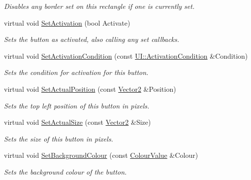 \begin{DoxyCompactItemize}
\begin{DoxyCompactList}\small\item\em Disables any border set on this rectangle if one is currently set. \item\end{DoxyCompactList}\item 
virtual void \hyperlink{classMezzanine_1_1UI_1_1Button_a89d0a1d2b0023be59e864b3c125f0dea}{SetActivation} (bool Activate)
\begin{DoxyCompactList}\small\item\em Sets the button as activated, also calling any set callbacks. \item\end{DoxyCompactList}\item 
virtual void \hyperlink{classMezzanine_1_1UI_1_1Button_a6c99108a01d71c521318640f52d2ee11}{SetActivationCondition} (const \hyperlink{namespaceMezzanine_1_1UI_aca58497951b1b9c7da10f214da3392f0}{UI::ActivationCondition} \&Condition)
\begin{DoxyCompactList}\small\item\em Sets the condition for activation for this button. \item\end{DoxyCompactList}\item 
virtual void \hyperlink{classMezzanine_1_1UI_1_1Button_ad7218bce5dda1c0e0bf91a83feaae47e}{SetActualPosition} (const \hyperlink{classMezzanine_1_1Vector2}{Vector2} \&Position)
\begin{DoxyCompactList}\small\item\em Sets the top left position of this button in pixels. \item\end{DoxyCompactList}\item 
virtual void \hyperlink{classMezzanine_1_1UI_1_1Button_a6a19f0e460a63e13f8c9bda3e18fcc96}{SetActualSize} (const \hyperlink{classMezzanine_1_1Vector2}{Vector2} \&Size)
\begin{DoxyCompactList}\small\item\em Sets the size of this button in pixels. \item\end{DoxyCompactList}\item 
virtual void \hyperlink{classMezzanine_1_1UI_1_1Button_a4cd47608dc2074f400d04812bf439f6f}{SetBackgroundColour} (const \hyperlink{classMezzanine_1_1ColourValue}{ColourValue} \&Colour)
\begin{DoxyCompactList}\small\item\em Sets the background colour of the button. \item\end{DoxyCompactList}\item 

\end{DoxyCompactItemize}

